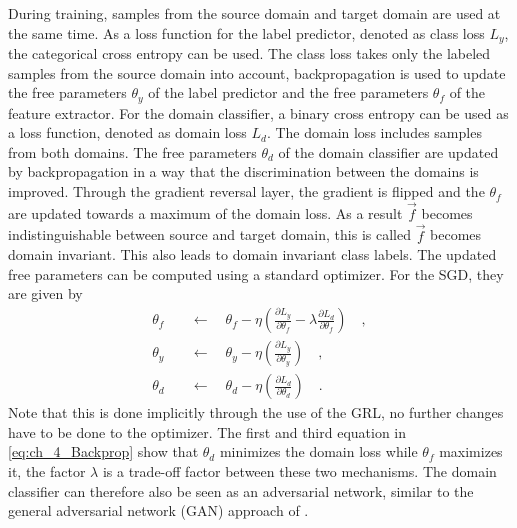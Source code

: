 During training, samples from the source domain and target domain are used at the same time. As a loss function for the label predictor, denoted as class loss $L_y$, the categorical cross entropy can be used. The class loss takes only the labeled samples from the source domain into account, backpropagation is used to update the free parameters $\theta_y$ of the label predictor and the free parameters $\theta_f$ of the feature extractor. For the domain classifier, a binary cross entropy can be used as a loss function, denoted as domain loss $L_d$. The domain loss includes samples from both domains. The free parameters $\theta_d$ of the domain classifier are updated by backpropagation in a way that the discrimination between the domains is improved. Through the gradient reversal layer, the gradient is flipped and the $\theta_f$ are updated towards a maximum of the domain loss. As a result $\vec{f}$ becomes indistinguishable between source and target domain, this is called $\vec{f}$ becomes domain invariant. This also leads to domain invariant class labels. The updated free parameters can be computed using a standard optimizer. For the SGD, they are given by
\begin{equation}\label{eq:ch_4_Backprop}
\begin{split}
\theta_f \quad &\leftarrow\quad  \theta_f - \eta \left( \frac{\partial L_y}{\partial \theta_{f}} - \lambda \frac{\partial L_d}{\partial \theta_{f}} \right) \quad ,\\
\theta_y \quad &\leftarrow\quad  \theta_y - \eta \left( \frac{\partial L_y}{\partial \theta_{y}} \right)\quad ,\\
\theta_d \quad &\leftarrow\quad  \theta_d - \eta \left( \frac{\partial L_d}{\partial \theta_{d}} \right) \quad .
\end{split}
\end{equation}
Note that this is done implicitly through the use of the GRL, no further changes have to be done to the optimizer. The first and third equation in \ref{eq:ch_4_Backprop} show that $\theta_d$ minimizes the domain loss while $\theta_f$ maximizes it, the factor $\lambda$ is a trade-off factor between these two mechanisms. The domain classifier can therefore also be seen as an adversarial network, similar to the general adversarial network (GAN) approach of \cite{Goodfellow}. 





